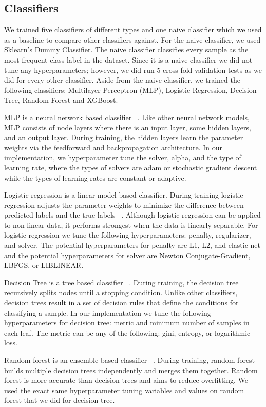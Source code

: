 \subsection{Classifiers}
We trained five classifiers of different types and one naive classifier which we used as a baseline to compare other classifiers against. For the naive classifier, we used Sklearn’s Dummy Classifier. The naive classifier classifies every sample as the most frequent class label in the dataset. Since it is a naive classifier we did not tune any hyperparameters; however, we did run 5 cross fold validation tests as we did for every other classifier. Aside from the naive classifier, we trained the following classifiers: Multilayer Perceptron (MLP), Logistic Regression, Decision Tree, Random Forest and XGBoost. 

MLP is a neural network based classifier ~\cite{Rosenblatt_1958}. Like other neural network models, MLP consists of node layers where there is an input layer, some hidden layers, and an output layer. During training, the hidden layers learn the parameter weights via the feedforward and backpropagation architecture. In our implementation, we hyperparameter tune the solver, alpha, and the type of learning rate, where the types of solvers are adam or stochastic gradient descent while  the types of learning rates are constant or adaptive. 

Logistic regression is a linear model based classifier. During training logistic regression adjusts the parameter weights to minimize the difference between predicted labels and the true labels ~\cite{Cox_1958}. Although logistic regression can be applied to non-linear data, it performs strongest when the data is linearly separable. For logistic regression we tune the following hyperparameters: penalty, regularizer, and solver. The potential hyperparameters for penalty are L1, L2, and elastic net and the potential hyperparameters for solver are Newton Conjugate-Gradient, LBFGS, or LIBLINEAR. 

Decision Tree is a tree based classifier ~\cite{Belson_1959}. During training, the decision tree recursively splits nodes until a stopping condition. Unlike other classifiers, decision trees result in a set of decision rules that define the conditions for classifying a sample. In our implementation we tune the following hyperparameters for decision tree: metric and minimum number of samples in each leaf. The metric can be any of the following: gini, entropy, or logarithmic loss. 

Random forest is an ensemble based classifier ~\cite{Morgan_Sonquist_1963}. During training, random forest builds multiple decision trees independently and merges them together. Random forest is more accurate than decision trees and aims to reduce overfitting. We used the exact same hyperparameter tuning variables and values on random forest that we did for decision tree. 

